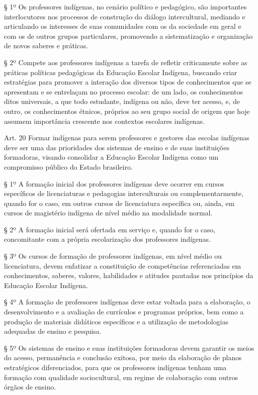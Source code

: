 \documentclass[
]{book}
\begin{document}
§ 1º Os professores indígenas, no cenário político e pedagógico, são importantes interlocutores nos processos de construção do diálogo intercultural, mediando e articulando os interesses de suas comunidades com os da sociedade em geral e com os de outros grupos particulares, promovendo a sistematização e organização de novos saberes e práticas.

§ 2º Compete aos professores indígenas a tarefa de refletir criticamente sobre as práticas políticas pedagógicas da Educação Escolar Indígena, buscando criar estratégias para promover a interação dos diversos tipos de conhecimentos que se apresentam e se entrelaçam no processo escolar: de um lado, os conhecimentos ditos universais, a que todo estudante, indígena ou não, deve ter acesso, e, de outro, os conhecimentos étnicos, próprios ao seu grupo social de origem que hoje assumem importância crescente nos contextos escolares indígenas.

Art. 20 Formar indígenas para serem professores e gestores das escolas indígenas deve ser uma das prioridades dos sistemas de ensino e de suas instituições formadoras, visando consolidar a Educação Escolar Indígena como um compromisso público do Estado brasileiro.

§ 1º A formação inicial dos professores indígenas deve ocorrer em cursos específicos de licenciaturas e pedagogias interculturais ou complementarmente, quando for o caso, em outros cursos de licenciatura específica ou, ainda, em cursos de magistério indígena de nível médio na modalidade normal.

§ 2º A formação inicial será ofertada em serviço e, quando for o caso, concomitante com a própria escolarização dos professores indígenas.

§ 3º Os cursos de formação de professores indígenas, em nível médio ou licenciatura, devem enfatizar a constituição de competências referenciadas em conhecimentos, saberes, valores, habilidades e atitudes pautadas nos princípios da Educação Escolar Indígena.

§ 4º A formação de professores indígenas deve estar voltada para a elaboração, o desenvolvimento e a avaliação de currículos e programas próprios, bem como a produção de materiais didáticos específicos e a utilização de metodologias adequadas de ensino e pesquisa.

§ 5º Os sistemas de ensino e suas instituições formadoras devem garantir os meios do acesso, permanência e conclusão exitosa, por meio da elaboração de planos estratégicos diferenciados, para que os professores indígenas tenham uma formação com qualidade sociocultural, em regime de colaboração com outros órgãos de ensino.
\end{document}
